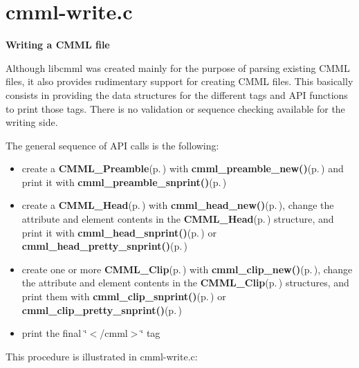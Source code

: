 \section{cmml-write.c}
{\bf Writing a CMML file}

Although libcmml was created mainly for the purpose of parsing existing CMML files, it also provides rudimentary support for creating CMML files. This basically consists in providing the data structures for the different tags and API functions to print those tags. There is no validation or sequence checking available for the writing side.

The general sequence of API calls is the following:

\begin{itemize}
\item create a {\bf CMML\_\-Preamble}{\rm (p.\,\pageref{structCMML__Preamble})} with {\bf cmml\_\-preamble\_\-new()}{\rm (p.\,\pageref{cmml_8h_a56})} and print it with {\bf cmml\_\-preamble\_\-snprint()}{\rm (p.\,\pageref{cmml_8h_a73})}\item create a {\bf CMML\_\-Head}{\rm (p.\,\pageref{structCMML__Head})} with {\bf cmml\_\-head\_\-new()}{\rm (p.\,\pageref{cmml_8h_a59})}, change the attribute and element contents in the {\bf CMML\_\-Head}{\rm (p.\,\pageref{structCMML__Head})} structure, and print it with {\bf cmml\_\-head\_\-snprint()}{\rm (p.\,\pageref{cmml_8h_a77})} or {\bf cmml\_\-head\_\-pretty\_\-snprint()}{\rm (p.\,\pageref{cmml_8h_a78})}\item create one or more {\bf CMML\_\-Clip}{\rm (p.\,\pageref{structCMML__Clip})} with {\bf cmml\_\-clip\_\-new()}{\rm (p.\,\pageref{cmml_8h_a60})}, change the attribute and element contents in the {\bf CMML\_\-Clip}{\rm (p.\,\pageref{structCMML__Clip})} structures, and print them with {\bf cmml\_\-clip\_\-snprint()}{\rm (p.\,\pageref{cmml_8h_a79})} or {\bf cmml\_\-clip\_\-pretty\_\-snprint()}{\rm (p.\,\pageref{cmml_8h_a80})}\item print the final \char`\"{}$<$/cmml$>$\char`\"{} tag\end{itemize}


This procedure is illustrated in cmml-write.c: 

